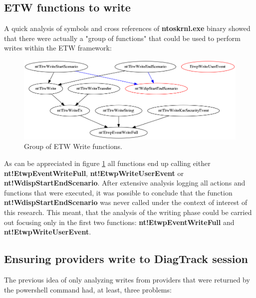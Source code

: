\subsection{\bfseries{ETW functions to write}}

A quick analysis of symbols and cross references of {\bfseries ntoskrnl.exe} binary showed that there were actually a "group of functions" that could be used to perform writes within the ETW framework:

\begin{centering}
  \begin{figure}[H]
    \includegraphics[width=15cm]{images/write_functions.png}
    \caption[]{Group of ETW Write functions.}
    \label{fig:etw_write_group_functions}
  \end{figure}
\end{centering}

As can be appreciated in figure \ref{fig:etw_write_group_functions} all functions end up calling either {\bfseries nt!EtwpEventWriteFull}, {\bfseries nt!EtwpWriteUserEvent} or {\bfseries nt!WdispStartEndScenario}. After extensive analysis logging all actions and functions that were executed, it was possible to conclude that the function {\bfseries nt!WdispStartEndScenario} was never called under the context of interest of this research. This meant, that the analysis of the writing phase could be carried out focusing only in the first two functions: {\bfseries nt!EtwpEventWriteFull} and {\bfseries nt!EtwpWriteUserEvent}.


\subsection{\bfseries{Ensuring providers write to DiagTrack session}}
The previous idea of only analyzing writes from providers that were returned by the powershell command had, at least, three problems:

